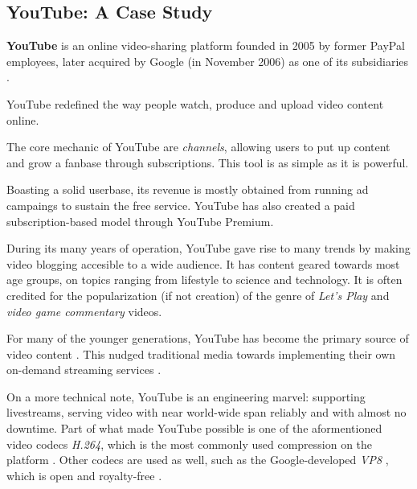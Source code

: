 \subsection{YouTube: A Case Study}
\textbf{YouTube} is an online video-sharing platform founded in 2005 by former PayPal employees, later acquired by Google (in November 2006) as one of its subsidiaries \cite{wiki:YouTube}.

YouTube redefined the way people watch, produce and upload video content online.

The core mechanic of YouTube are \emph{channels}, allowing users to put up content and grow a fanbase through subscriptions.
This tool is as simple as it is powerful.

Boasting a solid userbase, its revenue is mostly obtained from running ad campaings to sustain the free service.
YouTube has also created a paid subscription-based model through YouTube Premium.

During its many years of operation, YouTube gave rise to many trends by making video blogging accesible to a wide audience.
It has content geared towards most age groups, on topics ranging from lifestyle to science and technology.
It is often credited for the popularization (if not creation) of the genre of \emph{Let's Play} and \emph{video game commentary} videos.

For many of the younger generations, YouTube has become the primary source of video content \cite{youtube_phrasee}.
This nudged traditional media towards implementing their own on-demand streaming services \cite{youtube_phrasee}.

On a more technical note, YouTube is an engineering marvel: supporting livestreams, serving video with near world-wide span reliably and with almost no downtime.
Part of what made YouTube possible is one of the aformentioned video codecs \emph{H.264}, which is the most commonly used compression on the platform \cite{youtube_quality}.
Other codecs are used as well, such as the Google-developed \emph{VP8} \cite{youtube_quality}, which is open and royalty-free \cite{wiki:VP8}.

